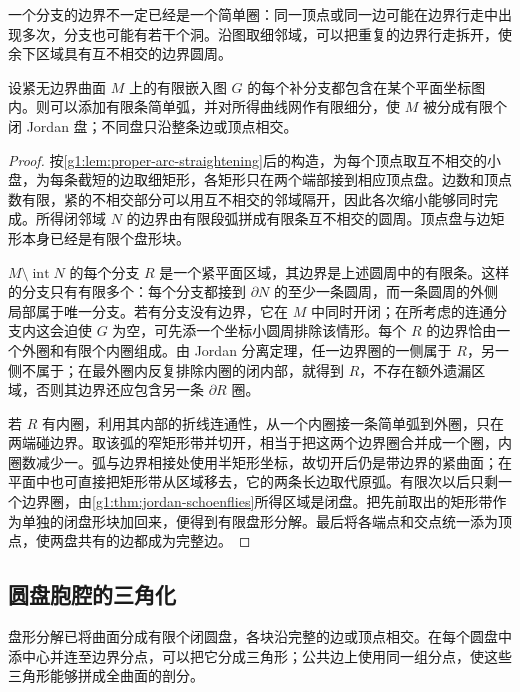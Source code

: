 一个分支的边界不一定已经是一个简单圈：同一顶点或同一边可能在边界行走中出现多次，分支也可能有若干个洞。沿图取细邻域，可以把重复的边界行走拆开，使余下区域具有互不相交的边界圆周。

\begin{lemma}\label{g1:lem:finite-network-disk-cells}
	设紧无边界曲面 \(M\) 上的有限嵌入图 \(G\) 的每个补分支都包含在某个平面坐标图内。则可以添加有限条简单弧，并对所得曲线网作有限细分，使 \(M\) 被分成有限个闭 Jordan 盘；不同盘只沿整条边或顶点相交。
\end{lemma}

\begin{proof}
	按\cref{g1:lem:proper-arc-straightening}后的构造，为每个顶点取互不相交的小盘，为每条截短的边取细矩形，各矩形只在两个端部接到相应顶点盘。边数和顶点数有限，紧的不相交部分可以用互不相交的邻域隔开，因此各次缩小能够同时完成。所得闭邻域 \(N\) 的边界由有限段弧拼成有限条互不相交的圆周。顶点盘与边矩形本身已经是有限个盘形块。

	\(M\setminus\operatorname{int}N\) 的每个分支 \(R\) 是一个紧平面区域，其边界是上述圆周中的有限条。这样的分支只有有限多个：每个分支都接到 \(\partial N\) 的至少一条圆周，而一条圆周的外侧局部属于唯一分支。若有分支没有边界，它在 \(M\) 中同时开闭；在所考虑的连通分支内这会迫使 \(G\) 为空，可先添一个坐标小圆周排除该情形。每个 \(R\) 的边界恰由一个外圈和有限个内圈组成。由 Jordan 分离定理，任一边界圈的一侧属于 \(R\)，另一侧不属于；在最外圈内反复排除内圈的闭内部，就得到 \(R\)，不存在额外遗漏区域，否则其边界还应包含另一条 \(\partial R\) 圈。

	若 \(R\) 有内圈，利用其内部的折线连通性，从一个内圈接一条简单弧到外圈，只在两端碰边界。取该弧的窄矩形带并切开，相当于把这两个边界圈合并成一个圈，内圈数减少一。弧与边界相接处使用半矩形坐标，故切开后仍是带边界的紧曲面；在平面中也可直接把矩形带从区域移去，它的两条长边取代原弧。有限次以后只剩一个边界圈，由\cref{g1:thm:jordan-schoenflies}所得区域是闭盘。把先前取出的矩形带作为单独的闭盘形块加回来，便得到有限盘形分解。最后将各端点和交点统一添为顶点，使两盘共有的边都成为完整边。
\end{proof}

\subsection{圆盘胞腔的三角化}
\label{g1:subsec:0602:04}

盘形分解已将曲面分成有限个闭圆盘，各块沿完整的边或顶点相交。在每个圆盘中添中心并连至边界分点，可以把它分成三角形；公共边上使用同一组分点，使这些三角形能够拼成全曲面的剖分。

